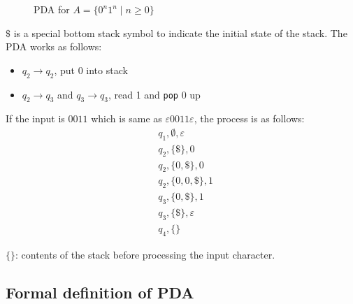 \begin{figure}[H]
    \centering
    \caption{PDA for \(A = \{0^n 1^n \mid n \geq 0\}\)}
\end{figure}

$\$$ is a special bottom stack symbol to indicate the initial state of the stack. The PDA works as follows:

\begin{itemize}
    \item $q_2 \rightarrow q_2$, put 0 into stack
    \item $q_2 \rightarrow q_3$ and $q_3 \rightarrow q_3$, read 1 and \texttt{pop} 0 up
\end{itemize}

If the input is $0011$ which is same as $\varepsilon 0011 \varepsilon$, the process is as follows:
\begin{equation*}
    \begin{split}
    & q_1, \emptyset, \varepsilon\\
    & q_2, \{\$\}, 0 \\
    & q_2, \{0,\$\}, 0\\
    & q_2, \{0,0,\$\}, 1\\
    & q_3, \{0,\$\}, 1\\
    & q_3, \{\$\}, \varepsilon\\
    & q_4, \{\}
    \end{split}
\end{equation*}
\begin{notation}
    $\{\}$: contents of the stack before processing the input character.
\end{notation}

\newpage

\subsection{Formal definition of PDA}

